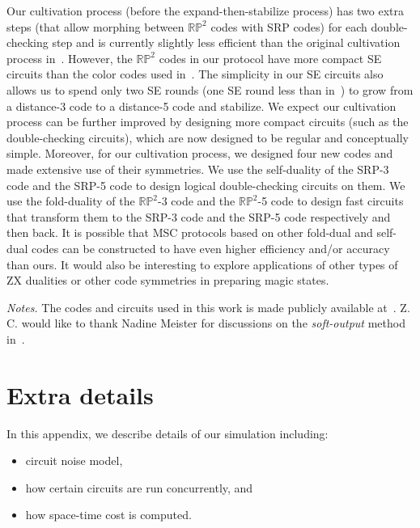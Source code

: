 \documentclass[reprint,aps,twocolumn,superscriptaddress,showpacs,notitlepage,10pt]{revtex4-2}
\theoremstyle{definition}
\begin{document}
Our cultivation process (before the expand-then-stabilize process) has two extra steps (that allow morphing between $\mathbb{RP}^2$ codes with SRP codes) for each double-checking step and is currently slightly less efficient than the original cultivation process in~\cite{gidney_magic_2024}. However, the $\mathbb{RP}^2$ codes in our protocol have more compact SE circuits than the color codes used in~\cite{gidney_magic_2024}. The simplicity in our SE circuits also allows us to spend only two SE rounds (one SE round less than in~\cite{gidney_magic_2024}) to grow from a distance-3 code to a distance-5 code and stabilize. We expect our cultivation process can be further improved by designing more compact circuits (such as the double-checking circuits), which are now designed to be regular and conceptually simple. Moreover, for our cultivation process, we designed four new codes and made extensive use of their symmetries. We use the self-duality of the SRP-3 code and the SRP-5 code to design logical double-checking circuits on them. We use the fold-duality of the $\mathbb{RP}^2$-3 code and the $\mathbb{RP}^2$-5 code to design fast circuits that transform them to the SRP-3 code and the SRP-5 code respectively and then back. It is possible that MSC protocols based on other fold-dual and self-dual codes can be constructed to have even higher efficiency and/or accuracy than ours. It would also be interesting to explore applications of other types of ZX dualities or other code symmetries in preparing magic states. 




\textit{Notes.} The codes and circuits used in this work is made publicly available at~\cite{zihan_culti}. Z. C. would like to thank Nadine Meister for discussions on the \textit{soft-output} method in~\cite{meister_efficient_2024}.
  



\appendix

\section{Extra details}\label{appsec: extra details}

In this appendix, we describe details of our simulation including:
\begin{itemize}
    \item circuit noise model,
    \item how certain circuits are run concurrently, and
    \item how space-time cost is computed. 
\end{itemize}
\end{document}
